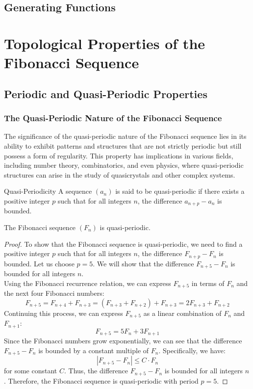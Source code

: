 \documentclass[openany]{book}
\begin{document}
\section{Generating Functions}
\chapter{Topological Properties of the Fibonacci Sequence}
\section{Periodic and Quasi-Periodic Properties}
\subsection{The Quasi-Periodic Nature of the Fibonacci Sequence}
The significance of the quasi-periodic nature of the Fibonacci sequence lies in its ability to exhibit patterns and structures that are not strictly periodic but still possess a form of regularity. This property has implications in various fields, including number theory, combinatorics, and even physics, where quasi-periodic structures can arise in the study of quasicrystals and other complex systems.
\begin{mydefinition}{Quasi-Periodicity}
    A sequence $(a_n)$ is said to be quasi-periodic if there exists a positive integer $p$ such that for all integers $n$, the difference $a_{n+p} - a_n$ is bounded. 
\end{mydefinition}
\begin{mytheorem}
    The Fibonacci sequence $(F_n)$ is quasi-periodic. 
\end{mytheorem}
\begin{proof}
    To show that the Fibonacci sequence is quasi-periodic, we need to find a positive integer $p$ such that for all integers $n$, the difference $F_{n+p} - F_n$ is bounded. Let us choose $p = 5$. We will show that the difference $F_{n+5} - F_n$ is bounded for all integers $n$. \\
    Using the Fibonacci recurrence relation, we can express $F_{n+5}$ in terms of $F_n$ and the next four Fibonacci numbers:
    \[    F_{n+5} = F_{n+4} + F_{n+3} = (F_{n+3} + F_{n+2}) + F_{n+3} = 2F_{n+3} + F_{n+2}
\] 
    Continuing this process, we can express $F_{n+5}$ as a linear combination of $F_n$ and $F_{n+1}$:
    \[    F_{n+5} = 5F_n + 3F_{n+1}
\]
    Since the Fibonacci numbers grow exponentially, we can see that the difference $F_{n+5} - F_n$ is bounded by a constant multiple of $F_n$. Specifically, we have:
    \[
        |F_{n+5} - F_n| \leq C \cdot F_n
    \]
    for some constant $C$. Thus, the difference $F_{n+5} - F_n$ is bounded for all integers $n$. Therefore, the Fibonacci sequence is quasi-periodic with period $p = 5$.
\end{proof}
\end{document}
